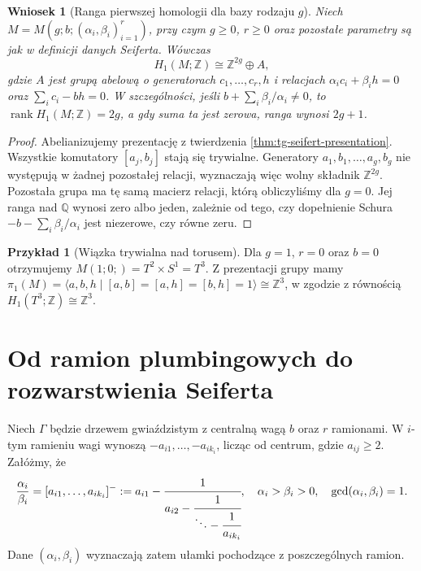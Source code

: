 \documentclass[11pt,a4paper]{report}
\numberwithin{equation}{section}
\theoremstyle{plain}
\newtheorem{wniosek}[twierdzenie]{Wniosek}
\theoremstyle{definition}
\newtheorem{przyklad}[twierdzenie]{Przykład}
\theoremstyle{remark}
\begin{document}
\begin{wniosek}[Ranga pierwszej homologii dla bazy rodzaju $g$]
\label{cor:tg-seifert-general-h1}
Niech $M=M(g;b;(\alpha_i,\beta_i)_{i=1}^r)$, przy czym
$g\geq0$, $r\geq0$ oraz pozostałe parametry są jak
w definicji danych Seiferta. Wówczas
\[
H_1(M;\mathbb Z)\cong\mathbb Z^{2g}\oplus A,
\]
gdzie $A$ jest grupą abelową o generatorach
$c_1,\ldots,c_r,h$ i relacjach
$\alpha_i c_i+\beta_i h=0$ oraz
$\sum_i c_i-bh=0$.
W szczególności, jeśli $b+\sum_i\beta_i/\alpha_i\ne0$,
to $\operatorname{rank}H_1(M;\mathbb Z)=2g$,
a gdy suma ta jest zerowa, ranga wynosi $2g+1$.
\end{wniosek}
\begin{proof}
Abelianizujemy prezentację z twierdzenia
\ref{thm:tg-seifert-presentation}. Wszystkie komutatory
$[a_j,b_j]$ stają się trywialne. Generatory
$a_1,b_1,\ldots,a_g,b_g$ nie występują w żadnej
pozostałej relacji, wyznaczają więc wolny składnik
$\mathbb Z^{2g}$. Pozostała grupa ma tę samą macierz
relacji, którą obliczyliśmy dla $g=0$.
Jej ranga nad $\mathbb Q$ wynosi zero albo jeden,
zależnie od tego, czy dopełnienie Schura
$-b-\sum_i\beta_i/\alpha_i$ jest niezerowe,
czy równe zeru.
\end{proof}

\begin{przyklad}[Wiązka trywialna nad torusem]
Dla $g=1$, $r=0$ oraz $b=0$ otrzymujemy
$M(1;0;)=T^2\times S^1=T^3$. Z prezentacji grupy
mamy $\pi_1(M)=\langle a,b,h\mid [a,b]=[a,h]=[b,h]=1\rangle
\cong\mathbb Z^3$, w zgodzie z równością
$H_1(T^3;\mathbb Z)\cong\mathbb Z^3$.
\end{przyklad}

\section{Od ramion plumbingowych do rozwarstwienia Seiferta}
\label{sec:tg-seifert-stars}

Niech $\Gamma$ będzie drzewem gwiaździstym z centralną
wagą $b$ oraz $r$ ramionami. W $i$-tym ramieniu wagi
wynoszą $-a_{i1},\ldots,-a_{ik_i}$, licząc od centrum,
gdzie $a_{ij}\ge2$. Załóżmy, że
\[
\frac{\alpha_i}{\beta_i}=
[a_{i1},\ldots,a_{ik_i}]^-
:=a_{i1}-\cfrac1{a_{i2}-\cfrac1{\ddots-\cfrac1{a_{ik_i}}}},
\quad \alpha_i>\beta_i>0,\quad\gcd(\alpha_i,\beta_i)=1.
\]
Dane $(\alpha_i,\beta_i)$ wyznaczają zatem ułamki
pochodzące z poszczególnych ramion.
\end{document}
